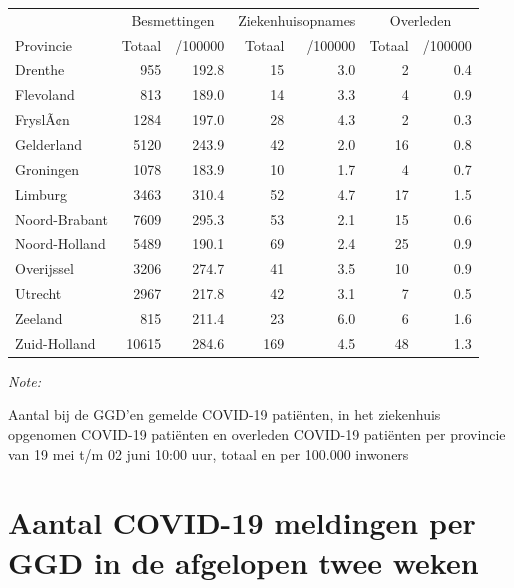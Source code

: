 \documentclass[
  english,
  man,floatsintext]{apa6}
\begin{document}
\begin{table}
\centering
\begin{threeparttable}
\begin{tabular}{lrrrrrr}
\toprule
\multicolumn{1}{c}{ } & \multicolumn{2}{c}{Besmettingen} & \multicolumn{2}{c}{Ziekenhuisopnames} & \multicolumn{2}{c}{Overleden} \\
\cmidrule(l{3pt}r{3pt}){2-3} \cmidrule(l{3pt}r{3pt}){4-5} \cmidrule(l{3pt}r{3pt}){6-7}
Provincie & Totaal & /100000 & Totaal & /100000 & Totaal & /100000\\
\midrule
Drenthe & 955 & 192.8 & 15 & 3.0 & 2 & 0.4\\
Flevoland & 813 & 189.0 & 14 & 3.3 & 4 & 0.9\\
FryslÃ¢n & 1284 & 197.0 & 28 & 4.3 & 2 & 0.3\\
Gelderland & 5120 & 243.9 & 42 & 2.0 & 16 & 0.8\\
Groningen & 1078 & 183.9 & 10 & 1.7 & 4 & 0.7\\
Limburg & 3463 & 310.4 & 52 & 4.7 & 17 & 1.5\\
Noord-Brabant & 7609 & 295.3 & 53 & 2.1 & 15 & 0.6\\
Noord-Holland & 5489 & 190.1 & 69 & 2.4 & 25 & 0.9\\
Overijssel & 3206 & 274.7 & 41 & 3.5 & 10 & 0.9\\
Utrecht & 2967 & 217.8 & 42 & 3.1 & 7 & 0.5\\
Zeeland & 815 & 211.4 & 23 & 6.0 & 6 & 1.6\\
Zuid-Holland & 10615 & 284.6 & 169 & 4.5 & 48 & 1.3\\
\bottomrule
\end{tabular}
\begin{tablenotes}
\item \textit{Note: } 
\item Aantal bij de GGD’en gemelde COVID-19 patiënten, in het ziekenhuis opgenomen COVID-19 patiënten en overleden COVID-19 patiënten per provincie van 19 mei t/m 02 juni 10:00 uur, totaal en per 100.000 inwoners
\end{tablenotes}
\end{threeparttable}
\end{table}

\newpage

\hypertarget{aantal-covid-19-meldingen-per-ggd-in-de-afgelopen-twee-weken}{%
\section{Aantal COVID-19 meldingen per GGD in de afgelopen twee weken}\label{aantal-covid-19-meldingen-per-ggd-in-de-afgelopen-twee-weken}}
\end{document}
